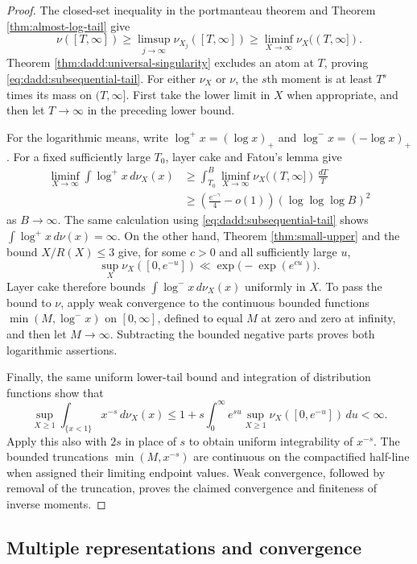 \documentclass[11pt,letterpaper,reqno]{amsart}
\numberwithin{equation}{section}
\theoremstyle{remark}
\renewcommand{\leq}{\leqslant}
\renewcommand{\geq}{\geqslant}
\begin{document}
\begin{proof}
The closed-set inequality in the portmanteau theorem and
Theorem \ref{thm:almost-log-tail} give
\[
 \nu([T,\infty])
 \geq\limsup_{j\to\infty}\nu_{X_j}([T,\infty])
 \geq\liminf_{X\to\infty}\nu_X((T,\infty]).
\]
Theorem \ref{thm:dadd:universal-singularity} excludes an atom at
$T$, proving \eqref{eq:dadd:subsequential-tail}. For either $\nu_X$
or $\nu$, the $s$th moment is at least $T^s$ times its mass on
$(T,\infty]$. First take the lower limit in $X$ when appropriate,
and then let $T\to\infty$ in the preceding lower bound.

For the logarithmic means, write $\log^+x=(\log x)_+$ and
$\log^-x=(-\log x)_+$. For a fixed sufficiently large $T_0$,
layer cake and Fatou's lemma give
\begin{align*}
 \liminf_{X\to\infty}\int\log^+x\,d\nu_X(x)
 &\geq\int_{T_0}^B
 \liminf_{X\to\infty}\nu_X((T,\infty])\,\frac{dT}{T}\\
 &\geq\left(\frac{e^{-\gamma}}4-o(1)\right)
 (\log\log\log B)^2
\end{align*}
as $B\to\infty$.
The same calculation using \eqref{eq:dadd:subsequential-tail}
shows $\int\log^+x\,d\nu(x)=\infty$. On the other hand,
Theorem \ref{thm:small-upper} and the bound $X/R(X)\leq3$ give,
for some $c>0$ and all sufficiently large $u$,
\[
 \sup_X\nu_X([0,e^{-u}])
 \ll\exp\bigl(-\exp(e^{cu})\bigr).
\]
Layer cake therefore bounds $\int\log^-x\,d\nu_X(x)$ uniformly
in $X$. To pass the bound to $\nu$, apply weak convergence to the
continuous bounded functions $\min(M,\log^-x)$ on $[0,\infty]$,
defined to equal $M$ at zero and zero at infinity, and then let
$M\to\infty$.
Subtracting the bounded negative parts proves both logarithmic
assertions.

Finally, the same uniform lower-tail bound and integration of distribution functions show that
\[
 \sup_{X\geq1}\int_{\{x<1\}}x^{-s}\,d\nu_X(x)
 \leq 1+s\int_0^\infty e^{su}
 \sup_{X\geq1}\nu_X([0,e^{-u}])\,du<\infty.
\]
Apply this also with $2s$ in place of $s$ to obtain uniform integrability
of $x^{-s}$. The bounded truncations $\min(M,x^{-s})$ are continuous
on the compactified half-line when assigned their limiting endpoint
values. Weak convergence, followed by removal of the truncation, proves
the claimed convergence and finiteness of inverse moments.
\end{proof}

\subsection{Multiple representations and convergence}
\end{document}
